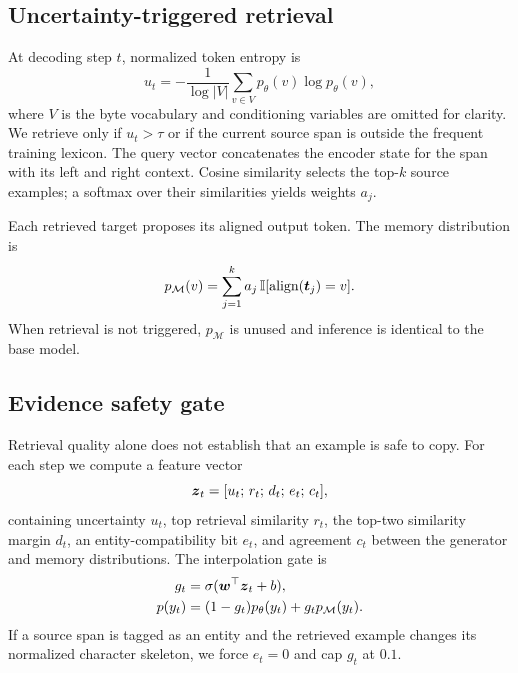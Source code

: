 \subsection{Uncertainty-triggered retrieval}

At decoding step $t$, normalized token entropy is
\begin{equation}
  u_t = -\frac{1}{\log |V|}
        \sum_{v\in V}p_{\theta}(v)\log p_{\theta}(v),
  \label{eq:entropy}
\end{equation}
where $V$ is the byte vocabulary and conditioning variables are omitted for
clarity. We retrieve only if $u_t>\tau$ or if the current source span is
outside the frequent training lexicon. The query vector concatenates the
encoder state for the span with its left and right context. Cosine similarity
selects the top-$k$ source examples; a softmax over their similarities yields
weights $a_j$.

Each retrieved target proposes its aligned output token. The memory
distribution is
\begin{equation}
  p_{\mathcal{M}}(v)=\sum_{j=1}^{k}a_j\,
  \mathbb{I}[\operatorname{align}(\boldsymbol{t}_j)=v].
  \label{eq:memory}
\end{equation}
When retrieval is not triggered, $p_{\mathcal{M}}$ is unused and inference is
identical to the base model.

\subsection{Evidence safety gate}

Retrieval quality alone does not establish that an example is safe to copy.
For each step we compute a feature vector
\begin{equation}
  \boldsymbol{z}_t=[u_t;\,r_t;\,d_t;\,e_t;\,c_t],
\end{equation}
containing uncertainty $u_t$, top retrieval similarity $r_t$, the top-two
similarity margin $d_t$, an entity-compatibility bit $e_t$, and agreement
$c_t$ between the generator and memory distributions. The interpolation gate
is
\begin{align}
  g_t &= \sigma(\boldsymbol{w}^{\top}\boldsymbol{z}_t+b), \\
  p(y_t) &= (1-g_t)p_{\theta}(y_t)+g_t p_{\mathcal{M}}(y_t).
  \label{eq:gate}
\end{align}
If a source span is tagged as an entity and the retrieved example changes its
normalized character skeleton, we force $e_t=0$ and cap $g_t$ at $0.1$.

